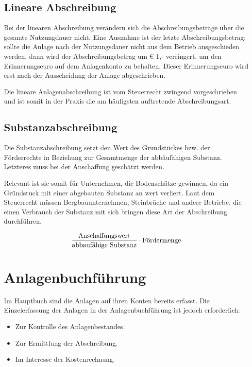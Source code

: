 \documentclass[a4paper,10pt]{report}
\begin{document}
\section{Lineare Abschreibung}
Bei der linearen Abschreibung verändern sich die Abschreibungsbeträge
über die gesamte Nutzungdauer nicht. Eine Ausnahme ist der letzte
Abschreibungsbetrag: sollte die Anlage nach der Nutzungsdauer nicht
aus dem Betrieb ausgeschieden werden, dann wird der
Abschreibungsbetrag um \euro{} 1,- verringert, um den Erinnerungseuro
auf dem Anlagenkonto zu behalten. Dieser Erinnerungseuro wird erst
nach der Ausscheidung der Anlage abgeschrieben.
\par

Die lineare Anlagenabschreibung ist vom Steuerrecht zwingend
vorgeschrieben und ist somit in der Praxis die am häufigsten
auftretende Abschreibungsart.

\section{Substanzabschreibung}
Die Substanzabschreibung setzt den Wert des Grundstückes bzw. der
Förderrechte in Beziehung zur Gesamtmenge der abbäufähigen
Substanz. Letzteres muss bei der Anschaffung geschätzt werden.
\par

Relevant ist sie somit für Unternehmen, die Bodenschätze gewinnen, da
ein Gründstuck mit einer abgebauten Substanz an wert verliert. Laut
dem Steuerrecht müssen Bergbauunternehmen, Steinbrüche und andere
Betriebe, die einen Verbrauch der Substanz mit sich bringen diese Art
der Abschreibung durchführen.
\par

\begin{equation}
  \label{eq:2}
  { \text{Anschaffungswert} \over \text{abbaufähige
Substanz} } \cdot \text{Fördermenge}
\end{equation}


\chapter{Anlagenbuchführung}
Im Hauptbuch sind die Anlagen auf ihren Konten bereits erfasst.  Die
Einzelerfassung der Anlagen in der Anlagenbuchführung ist jedoch
erforderlich:
\begin{itemize}
  \item Zur Kontrolle des Anlagenbestandes.
  \item Zur Ermittlung der Abschreibung.
  \item Im Interesse der Kostenrechnung.
\end{itemize}
\end{document}
